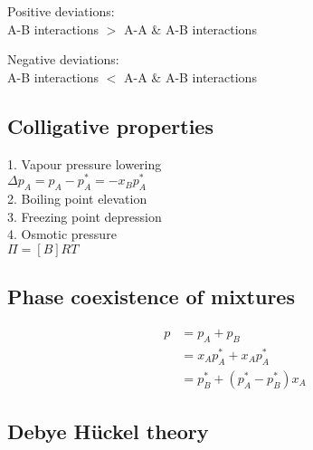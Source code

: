 Positive deviations: \\
A-B interactions $>$ A-A \& A-B interactions

Negative deviations: \\
A-B interactions $<$ A-A \& A-B interactions

\subsection*{Colligative properties}
1. Vapour pressure lowering \\
$\Delta p_A = p_A - p^{*}_{A} = -x_B p^*_A$ \\
2. Boiling point elevation \\
3. Freezing point depression \\
4. Osmotic pressure \\
$\Pi = [B]RT$

\subsection*{Phase coexistence of mixtures}
\begin{equation*}
    \begin{aligned}
        p & = p_A + p_B \\
        &= x_Ap_A^* + x_Ap_A^* \\
        &= p^*_B + (p_A^* - p_B^*)x_A
    \end{aligned}
\end{equation*}

\subsection*{Debye H\"uckel theory}



 
